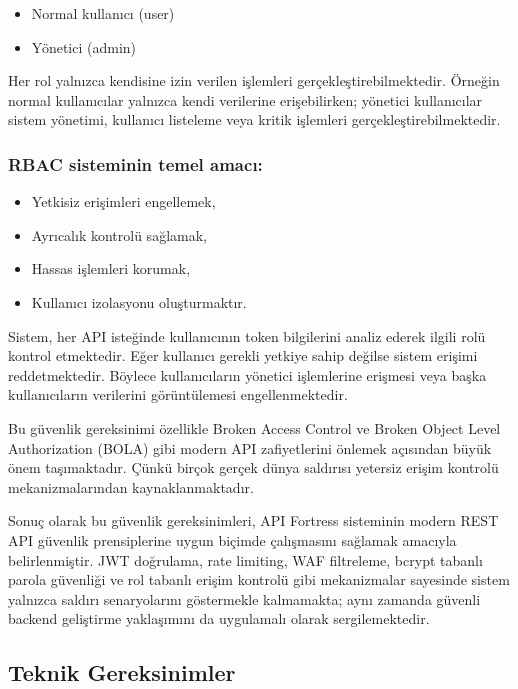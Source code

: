 \begin{itemize}[leftmargin=*]
    \item Normal kullanıcı (user)
    \item Yönetici (admin)
\end{itemize}

Her rol yalnızca kendisine izin verilen işlemleri gerçekleştirebilmektedir. Örneğin normal kullanıcılar yalnızca kendi verilerine erişebilirken; yönetici kullanıcılar sistem yönetimi, kullanıcı listeleme veya kritik işlemleri gerçekleştirebilmektedir.

\subsubsection{RBAC sisteminin temel amacı:}

\begin{itemize}[leftmargin=*]
    \item Yetkisiz erişimleri engellemek,
    \item Ayrıcalık kontrolü sağlamak,
    \item Hassas işlemleri korumak,
    \item Kullanıcı izolasyonu oluşturmaktır.
\end{itemize}

Sistem, her API isteğinde kullanıcının token bilgilerini analiz ederek ilgili rolü kontrol etmektedir. Eğer kullanıcı gerekli yetkiye sahip değilse sistem erişimi reddetmektedir. Böylece kullanıcıların yönetici işlemlerine erişmesi veya başka kullanıcıların verilerini görüntülemesi engellenmektedir.

Bu güvenlik gereksinimi özellikle Broken Access Control ve Broken Object Level Authorization (BOLA) gibi modern API zafiyetlerini önlemek açısından büyük önem taşımaktadır. Çünkü birçok gerçek dünya saldırısı yetersiz erişim kontrolü mekanizmalarından kaynaklanmaktadır.

Sonuç olarak bu güvenlik gereksinimleri, API Fortress sisteminin modern REST API güvenlik prensiplerine uygun biçimde çalışmasını sağlamak amacıyla belirlenmiştir. JWT doğrulama, rate limiting, WAF filtreleme, bcrypt tabanlı parola güvenliği ve rol tabanlı erişim kontrolü gibi mekanizmalar sayesinde sistem yalnızca saldırı senaryolarını göstermekle kalmamakta; aynı zamanda güvenli backend geliştirme yaklaşımını da uygulamalı olarak sergilemektedir.

\subsection{Teknik Gereksinimler}
\label{teknik-gereksinimler}

